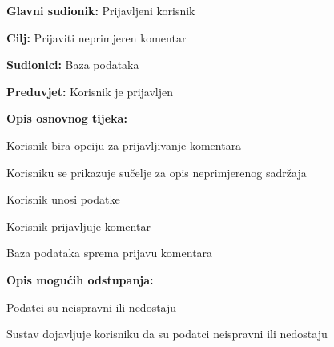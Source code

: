 \noindent {}
\begin{packed_item}

\item \textbf{Glavni sudionik:} Prijavljeni korisnik
\item  \textbf{Cilj:} Prijaviti neprimjeren komentar
\item  \textbf{Sudionici:} Baza podataka
\item  \textbf{Preduvjet:} Korisnik je prijavljen
\item  \textbf{Opis osnovnog tijeka:}

\item[] \begin{packed_enum}

    \item Korisnik bira opciju za prijavljivanje komentara
    \item Korisniku se prikazuje sučelje za opis neprimjerenog sadržaja
    \item Korisnik unosi podatke
    \item Korisnik prijavljuje komentar
    \item Baza podataka sprema prijavu komentara

\end{packed_enum}

\item  \textbf{Opis mogućih odstupanja:}

\item[] \begin{packed_item}

    \item[5.a] Podatci su neispravni ili nedostaju
    \item[] \begin{packed_enum}

        \item Sustav dojavljuje korisniku da su podatci neispravni ili nedostaju

    \end{packed_enum}

\end{packed_item}
\end{packed_item}

